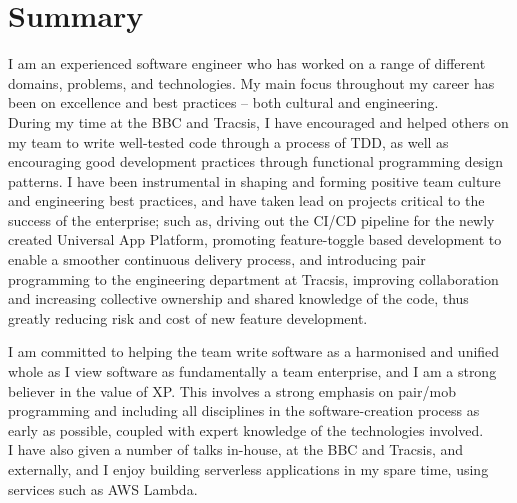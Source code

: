 \section{Summary}

I am an experienced software engineer who has worked on a range of different domains, problems, and technologies. My main focus throughout my career has been on excellence and best practices – both cultural and engineering.\\

During my time at the BBC and Tracsis, I have encouraged and helped others on my team to write well-tested code through a process of TDD, as well as encouraging good development practices through functional programming design patterns. I have been instrumental in shaping and forming positive team culture and engineering best practices, and have taken lead on projects critical to the success of the enterprise; such as, driving out the CI/CD pipeline for the newly created Universal App Platform, promoting feature-toggle based development to enable a smoother continuous delivery process, and introducing pair programming to the engineering department at Tracsis, improving collaboration and increasing collective ownership and shared knowledge of the code, thus greatly reducing risk and cost of new feature development.

I am committed to helping the team write software as a harmonised and unified whole as I view software as fundamentally a team enterprise, and I am a strong believer in the value of XP. This involves a strong emphasis on pair/mob programming and including all disciplines in the software-creation process as early as possible, coupled with expert knowledge of the technologies involved.\\

I have also given a number of talks in-house, at the BBC and Tracsis, and externally, and I enjoy building serverless applications in my spare time, using services such as AWS Lambda.\\
